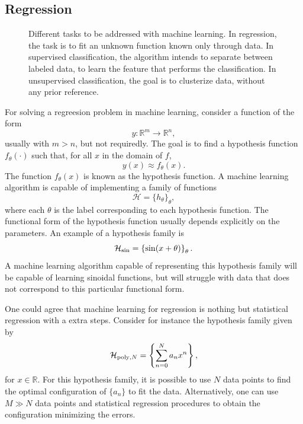\documentclass[]{report}
\begin{document}
\subsection{Regression}\label{sec.regression}

\begin{figure}



\caption{Different tasks to be addressed with machine learning. In regression, the task is to fit an unknown function known only through data. In supervised classification, the algorithm intends to separate between labeled data, to learn the feature that performs the classification. In unsupervised classification, the goal is to clusterize data, without any prior reference.}
\end{figure}


For solving a regreesion problem in machine learning, consider a function of the form 
\begin{equation}
y: \mathbb{R}^m \rightarrow \mathbb R^n, 
\end{equation}
usually with $m > n$, but not requiredly. The goal is to find a hypothesis function $f_\theta(\cdot)$ such that, for all $x$ in the domain of $f$, 
\begin{equation}
y(x) \approx f_\theta(x).
\end{equation}
The function $f_\theta(x)$ is known as the hypothesis function. A machine learning algorithm is capable of implementing a family of functions 
\begin{equation}
\mathcal H = \{ h_\theta\}_\theta, 
\end{equation}
where each $\theta$ is the label corresponding to each hypothesis function. The functional form of the hypothesis function usually depends explicitly on the parameters. An example of a hypothesis family is
\begin{equation}
\mathcal H_{\rm sin} = \left\{ \sin(x + \theta)\right\}_\theta.
\end{equation}
A machine learning algorithm capable of representing this hypothesis family will be capable of learning sinoidal functions, but will struggle with data that does not correspond to this particular functional form. 

One could agree that machine learning for regression is nothing but statistical regression with a extra steps. Consider for instance the hypothesis family given by
\begin{equation}
\mathcal H_{{\rm poly}, N} = \left\{ \sum_{n = 0}^N a_n x^n \right\}, 
\end{equation}
for $x \in \mathbb R$. For this hypothesis family, it is possible to use $N$ data points to find the optimal configuration of $\{ a_n\}$ to fit the data. Alternatively, one can use $M \gg N$ data points and statistical regression procedures to obtain the configuration minimizing the errors. 
\end{document}
